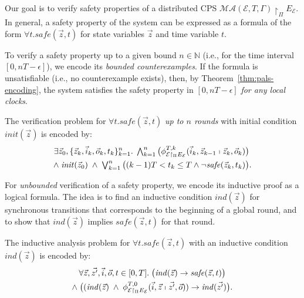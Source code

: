Our goal is to verify safety properties
of a distributed CPS $\mathcal{MA}(\mathcal{E}, T, \Gamma) \restriction_{\Pi} E_\mathcal{E}$.
In general, a safety property of the system can be expressed as a formula of the form 
$\forall t.  \mathit{safe}(\vec{z},t)$
for  state variables $\vec{z}$ and time variable $t$.


To verify %
a safety property %
up to a given bound $n \in \mathbb{N}$
(i.e., for the time interval $[0,nT - \epsilon]$),
we encode its \emph{bounded counterexamples}. %
If the formula is unsatisfiable (i.e., no counterexample exists), 
then, by Theorem~\ref{thm:pals-encoding},  the system satisfies the safety property in $[0,nT - \epsilon]$
\emph{for any local clocks}.



\begin{definition}
The verification problem for $\forall t.  \mathit{safe}(\vec{z},t)$
\emph{up to $n$ rounds} with  initial condition $\mathit{init}(\vec{z})$
is encoded by:
\begin{align*}
\exists \vec{z}_0, \{\vec{z}_k, \vec{i}_k, \vec{o}_k, t_k\}_{k=1}^{n}.\;
\textstyle\bigwedge_{k=1}^{n}
\big(\phi_{\mathcal{E} \restriction_{\Pi} E_\mathcal{E}}^{T,k}(
	\vec{i}_k, \vec{z}_{k-1}
	\shortmid 
	\vec{z}_{k}, \vec{o}_k)\big)
\phantom{.}
\\
\wedge\;
\mathit{init}(\vec{z}_0)
\;\wedge\;
\textstyle\bigvee_{k=1}^{n}
\big(
(k-1)T < t_{k} \leq T
\wedge
\neg\mathit{safe}(\vec{z}_k, t_{k}) 
\big).
\end{align*}
\end{definition}


For \emph{unbounded} verification of a safety property,
we encode its inductive proof as a logical formula.
The idea is to find an inductive condition $\mathit{ind}(\vec{z})$ 
for synchronous transitions
that corresponds to the beginning of a global round,
and to show that $\mathit{ind}(\vec{z})$ implies %
$\mathit{safe}(\vec{z},t)$ 
for that round.

\begin{definition} 
The  inductive analysis problem for $\forall t.  \mathit{safe}(\vec{z},t)$
with an inductive condition $\mathit{ind}(\vec{z})$ is encoded  by:
\begin{multline*}
\forall \vec{z}, \vec{z'}, \vec{i}, \vec{o}, t \in [0,T].\;
\big(\mathit{ind}(\vec{z})  \rightarrow \mathit{safe}(\vec{z},t)\big)
\\
\wedge\;
\big(
(\mathit{ind}(\vec{z})\;\wedge\;\phi_{\mathcal{E} \restriction_{\Pi} E_\mathcal{E}}^{T,0}(\vec{i}, \vec{z}\shortmid \vec{z'}, \vec{o}))
\rightarrow
\mathit{ind}(\vec{z'})\big)
.
\end{multline*}
\end{definition}

